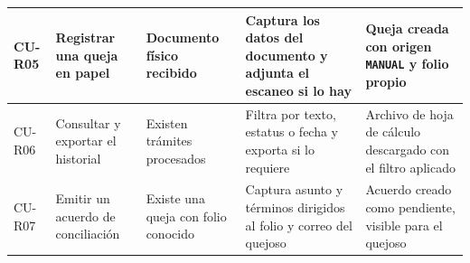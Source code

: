 \begin{longtable}{|p{1.5cm}|p{2.8cm}|p{2.6cm}|p{3.4cm}|p{3.4cm}|}
		CU-R05 & Registrar una queja en papel & Documento físico recibido & Captura los datos del
		documento y adjunta el escaneo si lo hay & Queja creada con origen \texttt{MANUAL} y folio
		propio \\ \hline
	
		CU-R06 & Consultar y exportar el historial & Existen trámites procesados & Filtra por texto,
		estatus o fecha y exporta si lo requiere & Archivo de hoja de cálculo descargado con el
		filtro aplicado \\ \hline
	
		CU-R07 & Emitir un acuerdo de conciliación & Existe una queja con folio conocido & Captura
		asunto y términos dirigidos al folio y correo del quejoso & Acuerdo creado como pendiente,
		visible para el quejoso \\ \hline
	\end{longtable}
	
